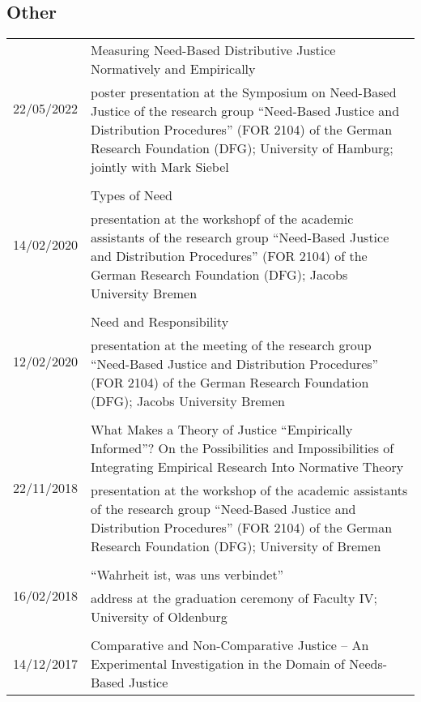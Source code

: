 \documentclass[a4paper,10pt]{article}
\begin{document}
\subsection*{Other}
\begin{longtable}{p{}p{11cm}}
\multirow{2}{2,25cm}{\footnotesize{22/05/2022}} & Measuring Need-Based Distributive Justice Normatively and Empirically\\
& \footnotesize{poster presentation at the Symposium on Need-Based Justice of the research group \enquote{Need-Based Justice and Distribution Procedures} (FOR 2104) of the German Research Foundation (DFG); University of Hamburg; jointly with Mark Siebel}\\
\\
\multirow{2}{2,25cm}{\footnotesize{14/02/2020}} & Types of Need\\
& \footnotesize{presentation at the workshopf of the academic assistants of the research group \enquote{Need-Based Justice and Distribution Procedures} (FOR 2104) of the German Research Foundation (DFG); Jacobs University Bremen}\\
\\
\multirow{2}{2,25cm}{\footnotesize{12/02/2020}} & Need and Responsibility\\
& \footnotesize{presentation at the meeting of the research group \enquote{Need-Based Justice and Distribution Procedures} (FOR 2104) of the German Research Foundation (DFG); Jacobs University Bremen}\\
\\
\multirow{2}{2,25cm}{\footnotesize{22/11/2018}} & What Makes a Theory of Justice \enquote{Empirically Informed}? On the Possibilities and Impossibilities of Integrating Empirical Research Into Normative Theory\\
& \footnotesize{presentation at the workshop of the academic assistants of the research group \enquote{Need-Based Justice and Distribution Procedures} (FOR 2104) of the German Research Foundation (DFG); University of Bremen}\\
\\
\multirow{2}{2,25cm}{\footnotesize{16/02/2018}} & \enquote{Wahrheit ist, was uns verbindet}\\
& \footnotesize{address at the graduation ceremony of Faculty IV; University of Oldenburg}\\
\\
\multirow{2}{2,25cm}{\footnotesize{14/12/2017}} & Comparative and Non-Comparative Justice -- An Experimental Investigation in the Domain of Needs-Based Justice\\

\end{longtable}
\end{document}

